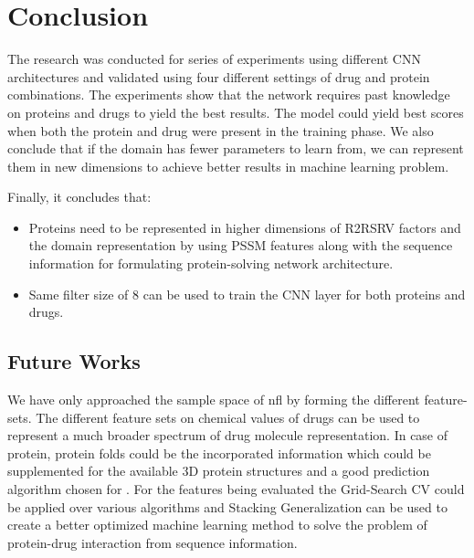 \chapter{Conclusion}

The research was conducted for series of experiments using different CNN architectures and validated using four different settings of drug and protein combinations. The experiments show that the network requires past knowledge on proteins and drugs to yield the best results. The model could yield best scores when both the protein and drug were present in the training phase. We also conclude that if the domain has fewer parameters to learn from, we can represent them in new dimensions to achieve better results in machine learning problem.

Finally, it concludes that:
\begin{itemize}
    \item Proteins need to be represented in higher dimensions of R2RSRV factors and the domain representation by using PSSM features along with the sequence information for formulating protein-solving network architecture.
    \item Same filter size of 8 can be used to train the CNN layer for both proteins and drugs.
\end{itemize}

\section{Future Works}

We have only approached the sample space of \acrfull{nfl} by forming the different feature-sets. The different feature sets on chemical values of drugs can be used to represent a much broader spectrum of drug molecule representation. In case of protein, protein folds could be the incorporated information which could be supplemented for the available 3D protein structures and a good prediction algorithm chosen for \citep{CASP82008}. For the features being evaluated the Grid-Search CV could be applied over various algorithms and Stacking Generalization can be used to create a better optimized machine learning method to solve the problem of protein-drug interaction from sequence information.


